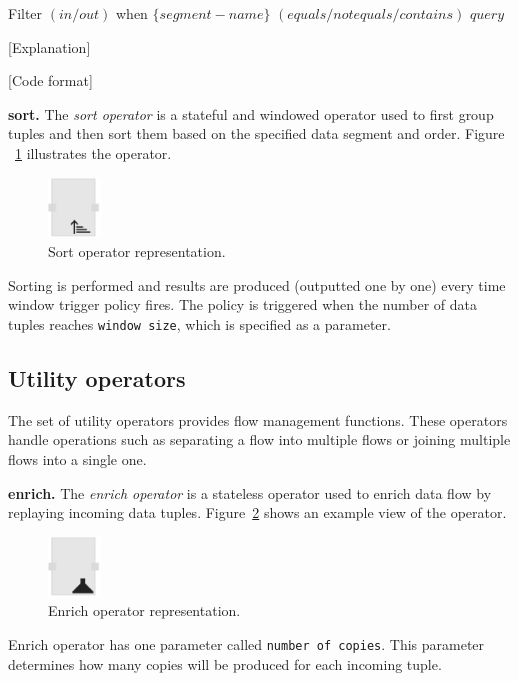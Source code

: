 Filter $(in/out)$ when $\{segment-name\}$ $(equals/not equals/contains)$ $query$

[Explanation]

[Code format]

\textbf{sort.}
The \textit{sort operator} is a stateful and windowed operator used to first group 
tuples and then sort them based on the specified data segment and order. Figure
~\ref{fig:sort operator} illustrates the operator.

\begin{figure}[ht]
	\centering
	\includegraphics[height=60px]{figures/SortOperator.pdf}
	\caption{Sort operator representation.}
	\label{fig:sort operator}
\end{figure}

Sorting is performed and results are produced (outputted one by one) every time 
window trigger policy fires. The policy is triggered when the number of data tuples 
reaches \texttt{window size}, which is specified as a parameter. 

\subsection{Utility operators}
The set of utility operators provides flow management functions. These operators 
handle operations such as separating a flow into multiple flows or joining multiple 
flows into a single one.

\textbf{enrich.}
The \textit{enrich operator} is a stateless operator used to enrich data flow by 
replaying incoming data tuples. Figure~\ref{fig:enrich operator} shows an example 
view of the operator.

\begin{figure}[ht]
	\centering
	\includegraphics[height=60px]{figures/EnrichOperator.pdf}
	\caption{Enrich operator representation.}
	\label{fig:enrich operator}
\end{figure}

Enrich operator has one parameter called \texttt{number of copies}. This parameter 
determines how many copies will be produced for each incoming tuple.

